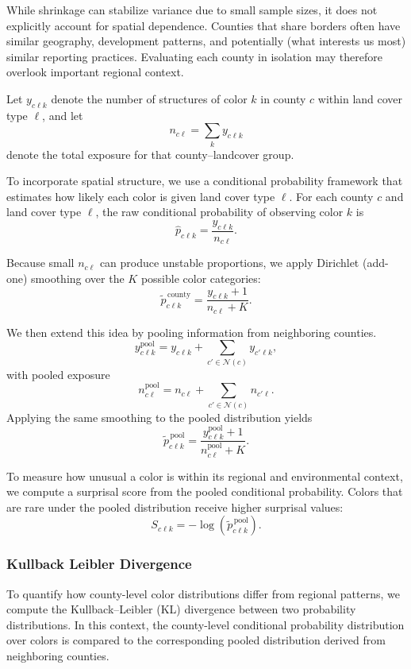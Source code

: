 \documentclass[11pt,letterpaper]{article}
\begin{document}
While shrinkage can stabilize variance due to small sample sizes, it does not explicitly account for spatial dependence. Counties that share borders often have similar geography, development patterns, and potentially (what interests us most) similar reporting practices. Evaluating each county in isolation may therefore overlook important regional context.

Let $y_{c\ell k}$ denote the number of structures of color $k$ in county $c$ within land cover type $\ell$, and let
\[
n_{c\ell} = \sum_k y_{c\ell k}
\]
denote the total exposure for that county--landcover group.

To incorporate spatial structure, we use a conditional probability framework that estimates how likely each color is given land cover type $\ell$. For each county $c$ and land cover type $\ell$, the raw conditional probability of observing color $k$ is
\[
\hat{p}_{c\ell k} = \frac{y_{c\ell k}}{n_{c\ell}}.
\]

Because small $n_{c\ell}$ can produce unstable proportions, we apply Dirichlet (add-one) smoothing over the $K$ possible color categories:
\[
\tilde{p}^{\,\text{county}}_{c\ell k} = \frac{y_{c\ell k} + 1}{n_{c\ell} + K}.
\]

We then extend this idea by pooling information from neighboring counties.
\[
y_{c\ell k}^{\text{pool}}
=
y_{c\ell k}
+
\sum_{c' \in \mathcal{N}(c)} y_{c'\ell k},
\]
with pooled exposure
\[
n_{c\ell}^{\text{pool}}
=
n_{c\ell}
+
\sum_{c' \in \mathcal{N}(c)} n_{c'\ell}.
\]
Applying the same smoothing to the pooled distribution yields
\[
\tilde{p}^{\,\text{pool}}_{c\ell k} = \frac{y^{\text{pool}}_{c\ell k} + 1}{n^{\text{pool}}_{c\ell} + K}.
\]

To measure how unusual a color is within its regional and environmental context, we compute a surprisal score from the pooled conditional probability. Colors that are rare under the pooled distribution receive higher surprisal values:
\[
S_{c\ell k} = -\log\!\left(\tilde{p}^{\,\text{pool}}_{c\ell k}\right).
\]


\subsubsection{Kullback Leibler Divergence}

To quantify how county-level color distributions differ from regional patterns, we compute the Kullback--Leibler (KL) \citep{wang2016klanomaly} divergence between two probability distributions. In this context, the county-level conditional probability distribution over colors is compared to the corresponding pooled distribution derived from neighboring counties.
\end{document}
